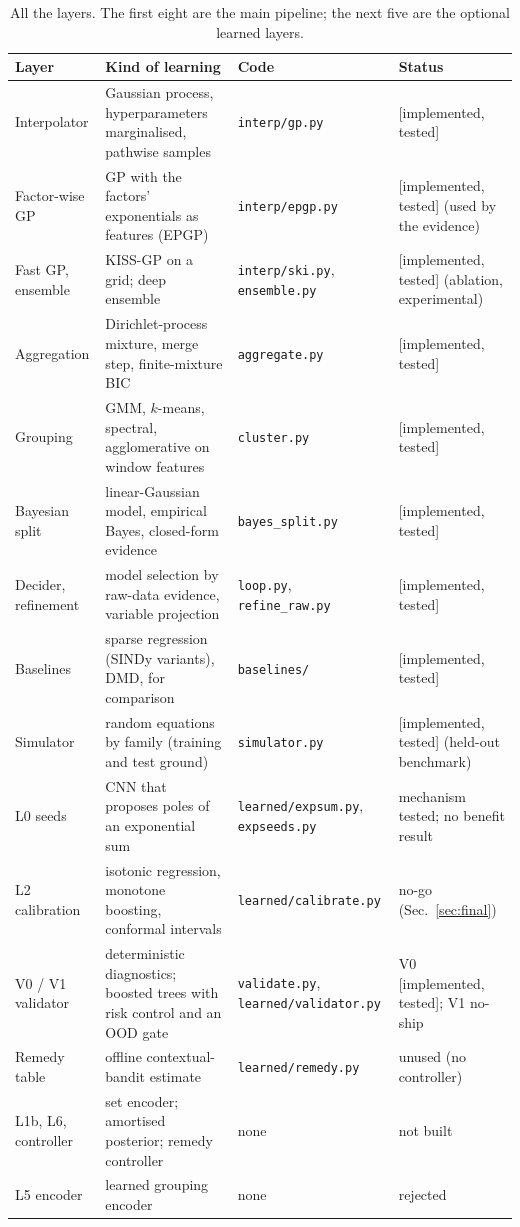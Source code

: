 \documentclass[11pt]{article}
\theoremstyle{plain}
\theoremstyle{definition}
\theoremstyle{remark}
\newcommand{\badge}[2]{\textcolor{#1}{\textsf{\footnotesize[#2]}}}
\newcommand{\impl}{\badge{cC}{implemented, tested}}
\begin{document}
\begin{table}[!htb]
\centering\small
\begin{tabular}{@{}L{2.9cm}L{4.6cm}L{3.3cm}L{2.4cm}@{}}
\toprule
Layer & Kind of learning & Code & Status\\\midrule
Interpolator & Gaussian process, hyperparameters marginalised, pathwise samples & \texttt{interp/gp.py} & \impl{}\\
Factor-wise GP & GP with the factors' exponentials as features (EPGP) & \texttt{interp/epgp.py} & \impl{} (used by the evidence)\\
Fast GP, ensemble & KISS-GP on a grid; deep ensemble & \texttt{interp/ski.py}, \texttt{ensemble.py} & \impl{} (ablation, experimental)\\
Aggregation & Dirichlet-process mixture, merge step, finite-mixture BIC & \texttt{aggregate.py} & \impl{}\\
Grouping & GMM, $k$-means, spectral, agglomerative on window features & \texttt{cluster.py} & \impl{}\\
Bayesian split & linear-Gaussian model, empirical Bayes, closed-form evidence & \texttt{bayes\_split.py} & \impl{}\\
Decider, refinement & model selection by raw-data evidence, variable projection & \texttt{loop.py}, \texttt{refine\_raw.py} & \impl{}\\
Baselines & sparse regression (SINDy variants), DMD, for comparison & \texttt{baselines/} & \impl{}\\
Simulator & random equations by family (training and test ground) & \texttt{simulator.py} & \impl{} (held-out benchmark)\\
L0 seeds & CNN that proposes poles of an exponential sum & \texttt{learned/}\allowbreak\texttt{expsum.py}, \texttt{expseeds.py} & mechanism tested; no benefit result\\
L2 calibration & isotonic regression, monotone boosting, conformal intervals & \texttt{learned/}\allowbreak\texttt{calibrate.py} & no-go (Sec.~\ref{sec:final})\\
V0 / V1 validator & deterministic diagnostics; boosted trees with risk control and an OOD gate & \texttt{validate.py}, \texttt{learned/}\allowbreak\texttt{validator.py} & V0 \impl{}; V1 no-ship\\
Remedy table & offline contextual-bandit estimate & \texttt{learned/}\allowbreak\texttt{remedy.py} & unused (no controller)\\
L1b, L6, controller & set encoder; amortised posterior; remedy controller & none & not built\\
L5 encoder & learned grouping encoder & none & rejected\\
\bottomrule
\end{tabular}
\caption{All the layers. The first eight are the main pipeline; the next five are the optional learned layers.}
\end{table}
\end{document}
